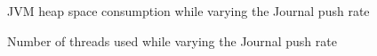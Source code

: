 \begin{figure}
  \begin{center} 
    \caption{JVM heap space consumption while varying the Journal push rate}
    \label{fig:plotheapspace}
  \end{center}
\end{figure}

\begin{figure}
  \begin{center} 
    \caption{Number of threads used while varying the Journal push rate}
    \label{fig:plotthreads}
  \end{center}
\end{figure}


